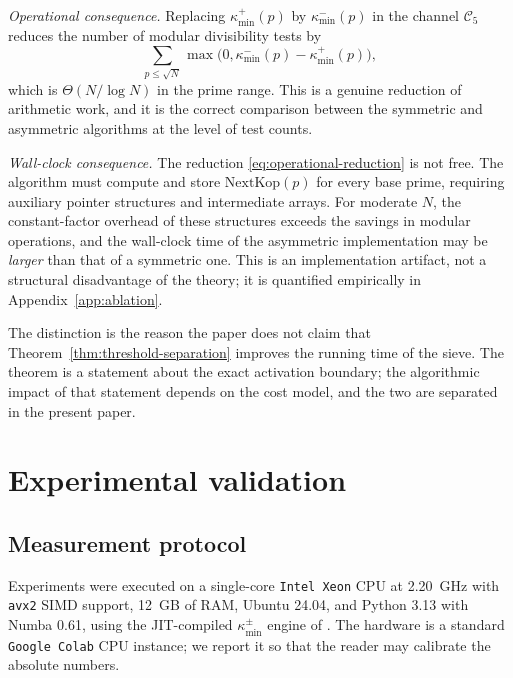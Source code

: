 \documentclass[11pt]{amsart}
\numberwithin{equation}{section}
\newcommand{\kmin}{\kappa_{\min}}
\newcommand{\kminp}{\kappa_{\min}^{+}}
\newcommand{\kminm}{\kappa_{\min}^{-}}
\newcommand{\Cfive}{\mathcal{C}_5}
\newcommand{\NextKop}{\mathrm{NextKop}}
\theoremstyle{plain}
\theoremstyle{definition}
\begin{document}
\emph{Operational consequence.} Replacing $\kminp(p)$ by $\kminm(p)$
in the channel $\Cfive$ reduces the number of modular divisibility
tests by
\begin{equation}
\sum_{p\le\sqrt{N}}\max\bigl(0,\kminm(p)-\kminp(p)\bigr),
\label{eq:operational-reduction}
\end{equation}
which is $\Theta(N/\log N)$ in the prime range. This is a genuine
reduction of arithmetic work, and it is the correct comparison between
the symmetric and asymmetric algorithms at the level of test counts.

\emph{Wall-clock consequence.} The reduction \eqref{eq:operational-reduction}
is not free. The algorithm must compute and store $\NextKop(p)$ for
every base prime, requiring auxiliary pointer structures and
intermediate arrays. For moderate $N$, the constant-factor overhead of
these structures exceeds the savings in modular operations, and the
wall-clock time of the asymmetric implementation may be \emph{larger}
than that of a symmetric one. This is an implementation artifact, not
a structural disadvantage of the theory; it is quantified empirically
in Appendix~\ref{app:ablation}.

The distinction is the reason the paper does not claim that
Theorem~\ref{thm:threshold-separation} improves the running time of
the sieve. The theorem is a statement about the exact activation
boundary; the algorithmic impact of that statement depends on the
cost model, and the two are separated in the present paper.

\section{Experimental validation}
\label{sec:empirical}

\subsection{Measurement protocol}
\label{subsec:protocol}

Experiments were executed on a single-core \texttt{Intel Xeon} CPU at
2.20~GHz with \texttt{avx2} SIMD support, 12~GB of RAM, Ubuntu 24.04,
and Python 3.13 with Numba 0.61, using the JIT-compiled
$\kmin^\pm$ engine of \cite{PeinadorSieve2026}. The hardware is a
standard \texttt{Google Colab} CPU instance; we report it so that the
reader may calibrate the absolute numbers.
\end{document}
